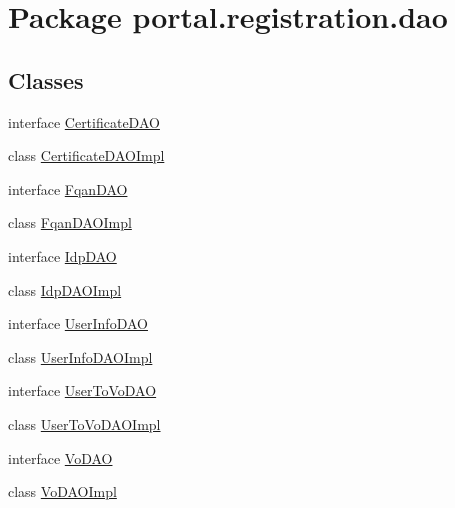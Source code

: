 \hypertarget{namespaceportal_1_1registration_1_1dao}{
\section{Package portal.registration.dao}
\label{namespaceportal_1_1registration_1_1dao}
}
\subsection*{Classes}
\begin{DoxyCompactItemize}
\item 
interface \hyperlink{interfaceportal_1_1registration_1_1dao_1_1CertificateDAO}{CertificateDAO}
\item 
class \hyperlink{classportal_1_1registration_1_1dao_1_1CertificateDAOImpl}{CertificateDAOImpl}
\item 
interface \hyperlink{interfaceportal_1_1registration_1_1dao_1_1FqanDAO}{FqanDAO}
\item 
class \hyperlink{classportal_1_1registration_1_1dao_1_1FqanDAOImpl}{FqanDAOImpl}
\item 
interface \hyperlink{interfaceportal_1_1registration_1_1dao_1_1IdpDAO}{IdpDAO}
\item 
class \hyperlink{classportal_1_1registration_1_1dao_1_1IdpDAOImpl}{IdpDAOImpl}
\item 
interface \hyperlink{interfaceportal_1_1registration_1_1dao_1_1UserInfoDAO}{UserInfoDAO}
\item 
class \hyperlink{classportal_1_1registration_1_1dao_1_1UserInfoDAOImpl}{UserInfoDAOImpl}
\item 
interface \hyperlink{interfaceportal_1_1registration_1_1dao_1_1UserToVoDAO}{UserToVoDAO}
\item 
class \hyperlink{classportal_1_1registration_1_1dao_1_1UserToVoDAOImpl}{UserToVoDAOImpl}
\item 
interface \hyperlink{interfaceportal_1_1registration_1_1dao_1_1VoDAO}{VoDAO}
\item 
class \hyperlink{classportal_1_1registration_1_1dao_1_1VoDAOImpl}{VoDAOImpl}
\end{DoxyCompactItemize}
